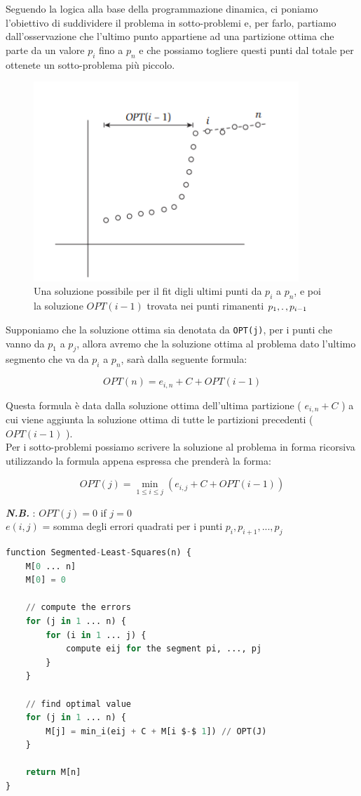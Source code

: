 Seguendo la logica alla base della programmazione dinamica, ci poniamo
l'obiettivo di suddividere il problema in sotto-problemi e, per farlo,
partiamo dall'osservazione che l'ultimo punto appartiene ad una
partizione ottima che parte da un valore $p_i$ fino a $p_n$ e che
possiamo togliere questi punti dal totale per ottenete un sotto-problema
più piccolo.
\begin{figure}[H]
\centering
  \includegraphics[width = 10cm, keepaspectratio]{Programmazione_dinamica/imgs/llsqr_funzionamento.png}
  \centering
  \caption{Una soluzione possibile per il fit digli ultimi punti da $p_i$ a $p_n$,
    e poi la soluzione $OPT(i-1)$ trovata nei punti rimanenti $p_1, \ldotp, p_{i-1}$}
\end{figure}
Supponiamo che la soluzione ottima sia denotata da
\texttt{OPT(j)}, per i punti che vanno da $p_1$ a $p_j$, allora
avremo che la soluzione ottima al problema dato l'ultimo segmento che va
da $p_i$ a $p_n$, sarà dalla seguente formula:

$$
  OPT(n) = e_{i,n} + C + OPT(i - 1)
$$

Questa formula è data dalla soluzione ottima dell'ultima partizione (
$e_{i,n} + C$ ) a cui viene aggiunta la soluzione ottima di tutte le
partizioni precedenti ( $OPT(i -1)$ ).\\

Per i sotto-problemi possiamo scrivere la soluzione al problema in forma
ricorsiva utilizzando la formula appena espressa che prenderà la forma:

$$
  OPT(j) = \min_{1 \leq i \leq j}(e_{i,j} + C + OPT(i - 1))
$$

\textbf{\emph{N.B.}} : $OPT(j) = 0$ if $j=0$\\

$e(i,j)$ = somma degli errori quadrati per i punti $p_i, p_{i+1},..., p_j$
\begin{lstlisting}[language=Python, mathescape=true]
function Segmented-Least-Squares(n) {
    M[0 ... n]
    M[0] = 0
    
    // compute the errors
    for (j in 1 ... n) {
        for (i in 1 ... j) {
            compute eij for the segment pi, ..., pj
        }
    }

    // find optimal value
    for (j in 1 ... n) {
        M[j] = min_i(eij + C + M[i $-$ 1]) // OPT(J)
    }

    return M[n]
}
\end{lstlisting}

